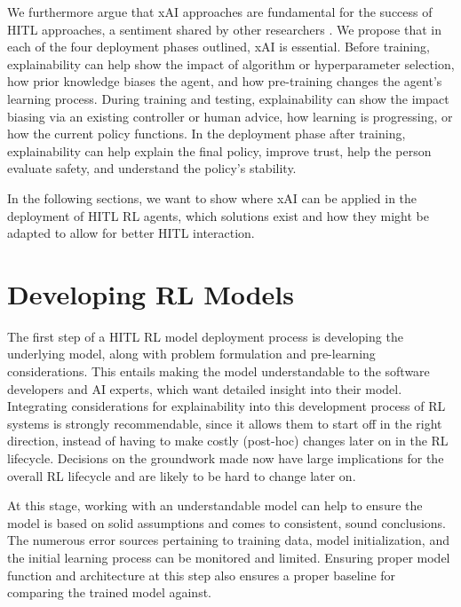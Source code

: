 \documentclass[twoside,11pt]{article}
\begin{document}
We furthermore argue that xAI approaches are fundamental for the success of HITL approaches, a sentiment shared by other researchers \citep{heuillet2021explainability,milani2022survey}. We propose that in each of the four deployment phases outlined, xAI is essential. Before training, explainability can help show the impact of algorithm or hyperparameter selection, how prior knowledge biases the agent, and how pre-training changes the agent's learning process. During training and testing, explainability can show the impact biasing via an existing controller or human advice, how learning is progressing, or how the current policy functions. In the deployment phase after training, explainability can help explain the final policy, improve trust, help the person evaluate safety, and understand the policy's stability. 

In the following sections, we want to show where xAI can be applied in the deployment of HITL RL agents, which solutions exist and how they might be adapted to allow for better HITL interaction.

\section{Developing RL Models}
\label{sec:Developing}

The first step of a HITL RL model deployment process is developing the underlying model, along with problem formulation and pre-learning considerations. This entails making the model understandable to the software developers and AI experts, which want detailed insight into their model. 
Integrating considerations for explainability into this development process of RL systems is strongly recommendable, since it allows them to start off in the right direction, instead of having to make costly (post-hoc) changes later on in the RL lifecycle. Decisions on the groundwork made now have large implications for the overall RL lifecycle and are likely to be hard to change later on.

At this stage, working with an understandable model can help to ensure the model is based on solid assumptions and comes to consistent, sound conclusions. The numerous error sources pertaining to training data, model initialization, and the initial learning process can be monitored and limited. Ensuring proper model function and architecture at this step also ensures a proper baseline for comparing the trained model against.
\end{document}

